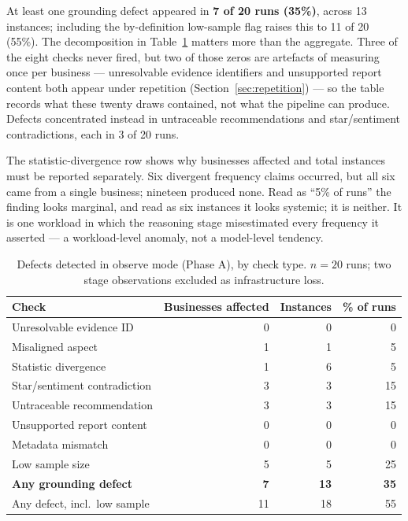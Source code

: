 \documentclass[runningheads]{llncs}
\begin{document}
At least one grounding defect appeared in \textbf{7 of 20 runs (35\%)}, across 13
instances; including the by-definition low-sample flag raises this to 11 of 20
(55\%). The decomposition in Table~\ref{tab:incidence} matters more than the
aggregate. Three of the eight checks never fired, but two of those zeros are
artefacts of measuring once per business --- unresolvable evidence identifiers and
unsupported report content both appear under repetition
(Section~\ref{sec:repetition}) --- so the table records what these twenty draws
contained, not what the pipeline can produce. Defects concentrated instead in
untraceable recommendations and star/sentiment contradictions, each in 3 of 20
runs.

The statistic-divergence row shows why businesses affected and total instances
must be reported separately. Six divergent frequency claims occurred, but all six
came from a single business; nineteen produced none. Read as ``5\% of runs'' the
finding looks marginal, and read as six instances it looks systemic; it is
neither. It is one workload in which the reasoning stage misestimated every
frequency it asserted --- a workload-level anomaly, not a model-level tendency.

\begin{table}[t]
\caption{Defects detected in observe mode (Phase A), by check type. $n=20$ runs;
two stage observations excluded as infrastructure loss.}
\label{tab:incidence}
\centering
\begin{tabular}{lrrr}
\toprule
Check & Businesses affected & Instances & \% of runs \\
\midrule
Unresolvable evidence ID      & 0 & 0 & 0 \\
Misaligned aspect             & 1 & 1 & 5 \\
Statistic divergence          & 1 & 6 & 5 \\
Star/sentiment contradiction  & 3 & 3 & 15 \\
Untraceable recommendation    & 3 & 3 & 15 \\
Unsupported report content    & 0 & 0 & 0 \\
Metadata mismatch             & 0 & 0 & 0 \\
Low sample size               & 5 & 5 & 25 \\
\midrule
\textbf{Any grounding defect} & \textbf{7} & \textbf{13} & \textbf{35} \\
Any defect, incl.\ low sample & 11 & 18 & 55 \\
\bottomrule
\end{tabular}
\end{table}
\end{document}
